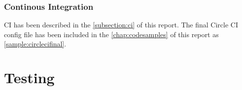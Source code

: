 \subsection{Continous Integration}
CI has been described in the \autoref{subsection:ci} of this report. The final Circle CI config
file has been included in the \autoref{chap:codesamples} of this report as \autoref{sample:circlecifinal}.

\chapter{Testing}
%
%
%
%

